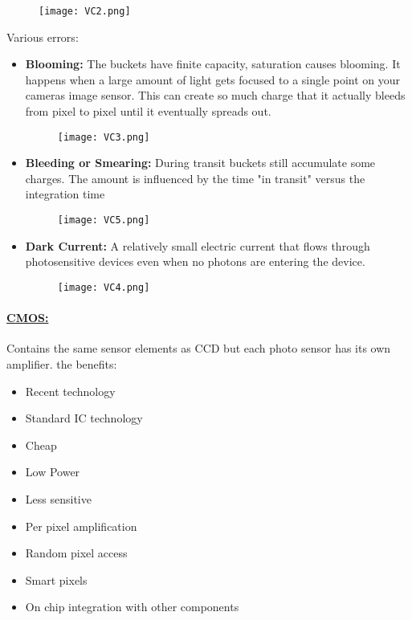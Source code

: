 \documentclass[8pt]{extreport}
\begin{document}
\begin{figure}[H]
\centering
\texttt{[image: VC2.png]}
\end{figure}

Various errors:
\begin{itemize}
\item \textbf{Blooming:} The buckets have finite capacity, saturation causes blooming. It happens when a large amount of light gets focused to a single point on your cameras image sensor. This can create so much charge that it actually bleeds from pixel to pixel until it eventually spreads out.

\begin{figure}[H]
\centering
\texttt{[image: VC3.png]}
\end{figure}
\item \textbf{Bleeding or Smearing:} During transit buckets still accumulate some charges. The amount is influenced by the time "in transit" versus the integration time
\begin{figure}[H]
\centering
\texttt{[image: VC5.png]}
\end{figure}
\item \textbf{Dark Current:} A relatively small electric current that flows through photosensitive devices even when no photons are entering the device.
\begin{figure}[H]
\centering
\texttt{[image: VC4.png]}
\end{figure}
\end{itemize}

\paragraph{\underline{CMOS:}} Contains the same sensor elements as CCD but each photo sensor has its own amplifier. the benefits:
\begin{itemize}
\item Recent technology
\item Standard IC technology
\item Cheap
\item Low Power
\item Less sensitive
\item Per pixel amplification
\item Random pixel access
\item Smart pixels
\item On chip integration with other components
\end{itemize}
\end{document}
